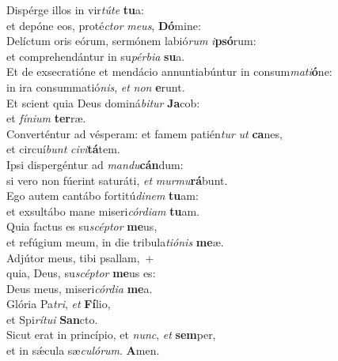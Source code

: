 \evenverse Dispérge illos in vir\textit{tú}\textit{te} \textbf{tu}a:~\*\\
\evenverse et depóne eos, proté\textit{ctor} \textit{me}\textit{us}, \textbf{Dó}mine:\\
\oddverse Delíctum oris eórum, sermónem labió\textit{rum} \textit{i}\textbf{psó}rum:~\*\\
\oddverse et comprehendántur in su\textit{pér}\textit{bi}\textit{a} \textbf{su}a.\\
\evenverse Et de exsecratióne et mendácio annuntiabúntur in consum\textit{ma}\textit{ti}\textbf{ó}ne:~\*\\
\evenverse in ira consummatió\textit{nis}, \textit{et} \textit{non} \textbf{e}runt.\\
\oddverse Et scient quia Deus dominá\textit{bi}\textit{tur} \textbf{Ja}cob:~\*\\
\oddverse et \textit{fí}\textit{ni}\textit{um} \textbf{ter}ræ.\\
\evenverse Converténtur ad vésperam: et famem patién\textit{tur} \textit{ut} \textbf{ca}nes,~\*\\
\evenverse et circuí\textit{bunt} \textit{ci}\textit{vi}\textbf{tá}tem.\\
\oddverse Ipsi dispergéntur ad \textit{man}\textit{du}\textbf{cán}dum:~\*\\
\oddverse si vero non fúerint saturáti, \textit{et} \textit{mur}\textit{mu}\textbf{rá}bunt.\\
\evenverse Ego autem cantábo fortitú\textit{di}\textit{nem} \textbf{tu}am:~\*\\
\evenverse et exsultábo mane miseri\textit{cór}\textit{di}\textit{am} \textbf{tu}am.\\
\oddverse Quia factus es su\textit{scép}\textit{tor} \textbf{me}us,~\*\\
\oddverse et refúgium meum, in die tribula\textit{ti}\textit{ó}\textit{nis} \textbf{me}æ.\\
\evenverse Adjútor meus, tibi psallam,~+\\
\evenverse  quia, Deus, su\textit{scép}\textit{tor} \textbf{me}us es:~\*\\
\evenverse Deus meus, miseri\textit{cór}\textit{di}\textit{a} \textbf{me}a.\\
\oddverse Glória Pa\textit{tri}, \textit{et} \textbf{Fí}lio,~\*\\
\oddverse et Spi\textit{rí}\textit{tu}\textit{i} \textbf{San}cto.\\
\evenverse Sicut erat in princípio, et \textit{nunc}, \textit{et} \textbf{sem}per,~\*\\
\evenverse et in sǽcula sæ\textit{cu}\textit{ló}\textit{rum}. \textbf{A}men.\\
